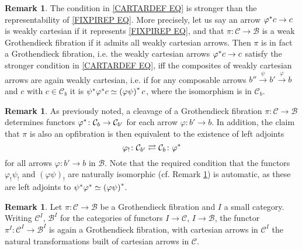 \documentclass[a4paper,10pt
]{article}%
\numberwithin{equation}{section}
\numberwithin{figure}{section}
\theoremstyle{definition} %
\newtheorem{remark}[equation]{Remark}%
\newcommand{\1}{\ensuremath{\mathbbm 1}}%
\begin{document}
\begin{remark}\label{COMPSEMI REM}
	The condition in \eqref{CARTARDEF EQ}
	is stronger than the representability of 
	\eqref{FIXPIREP EQ}.
	More precisely, let us say an arrow 
	$\varphi^{\**}c \to c$
	is weakly cartesian if it represents \eqref{FIXPIREP EQ},
	and that  
	$\pi \colon \mathcal{C} \to \mathcal{B}$
	is a weak Grothendieck fibration if it admits all weakly cartesian arrows.
	Then $\pi$ is in fact a Grothendieck fibration,
	i.e. the weakly cartesian arrows 
	$\varphi^{\**}c \to c$
	satisfy the stronger condition in \eqref{CARTARDEF EQ},
	iff the composites of weakly cartesian arrows are again weakly cartesian, 
	i.e. if 
	for any composable arrows
	$b'' \xrightarrow{\psi} b' \xrightarrow{\varphi} b$
	and $c$ with $c \in \mathcal{C}_b$ it is
	$\psi^{\**} \varphi^{\**} c \simeq 
	\left( \varphi \psi \right)^{\**} c$,
	where the isomorphism is in $\mathcal{C}_b$.
\end{remark}



\begin{remark}\label{ALSOOPADJ REM}
	As previously noted, a cleavage of a Grothendieck fibration $\pi \colon \mathcal{C} \to \mathcal{B}$ determines functors 
	$\varphi^{\**} \colon \mathcal{C}_b \to \mathcal{C}_{b'}$
	for each arrow $\varphi \colon b' \to b$.
	In addition, 
	the claim that $\pi$ is also an opfibration is then equivalent to the existence of left adjoints
	\[
	\varphi_! \colon
	\mathcal{C}_{b'}
	\rightleftarrows
	\mathcal{C}_{b}
	\colon \varphi^{\**}
	\]
	for all arrows $\varphi \colon b' \to b$ in $\mathcal{B}$.
	Note that the required condition that the functors
	$\varphi_! \psi_!$ and
	$(\varphi \psi)_!$
	are naturally isomorphic (cf. Remark \ref{COMPSEMI REM})
	is automatic, 
	as these are left adjoints to 
	$\psi^{\**} \varphi^{\**} \simeq 
	\left( \varphi \psi \right)^{\**}$.
\end{remark}


\begin{remark}\label{FUNISGROTH REM}
	Let $\pi \colon \mathcal{C} \to \mathcal{B}$
	be a Grothendieck fibration and
	$I$ a small category.
	Writing $\mathcal{C}^{I}$, $\mathcal{B}^{I}$ for the categories of functors 
	$I \to \mathcal{C}$, $I \to \mathcal{B}$,
	the functor
	$\pi^I \colon \mathcal{C}^I \to \mathcal{B}^I$
	is again a Grothendieck fibration, with cartesian arrows in $\mathcal{C}^I$ the natural transformations built of cartesian arrows in $\mathcal{C}$.
\end{remark}
\end{document}

